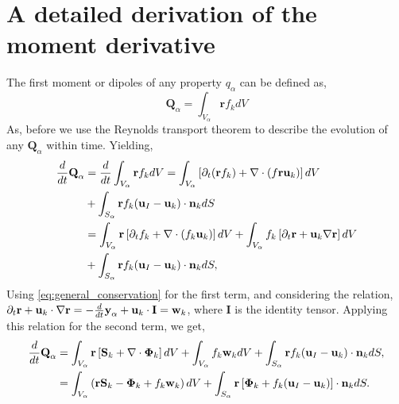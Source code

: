 \section{A detailed derivation of the moment derivative}
\label{ap:moment_derivative}
The first moment or dipoles of any property $q_\alpha$ can be defined as,
\begin{equation*}
    \textbf{Q}_\alpha 
    = \int_{V_\alpha} \textbf{r} f_k dV
\end{equation*}
As, before we use the Reynolds transport theorem to describe the evolution of any $\textbf{Q}_\alpha$ within time. 
Yielding,
\begin{align}
    \frac{d}{d t} \textbf{Q}_\alpha
    & = \frac{d}{d t} \int_{V_\alpha} \textbf{r} f_k dV  
    =  \int_{V_\alpha} \left[
        \partial_t(\textbf{r}  f_k)
        + \mathbf{\nabla} \cdot \left(f \textbf{r} \textbf{u}_k\right)
    \right]dV \nonumber \\
    &+ \int_{S_\alpha} \textbf{r}  f_k  (\textbf{u}_I-\textbf{u}_k)\cdot \textbf{n}_k  dS  \nonumber \\
    &=  \int_{V_\alpha} \textbf{r}\left[
        \partial_t f_k
        + \mathbf{\nabla} \cdot \left(f_k \textbf{u}_k\right)
    \right] dV
    + \int_{V_\alpha} f_k \left[
        \partial_t \textbf{r}
        +\textbf{u}_k \mathbf{\nabla} \textbf{r}
    \right]dV\\
    &+ \int_{S_\alpha} \textbf{r}  f_k (\textbf{u}_I-\textbf{u}_k)\cdot \textbf{n}_k  dS,
\end{align}
Using \ref{eq:general_conservation} for the first term, and considering the relation,
$  \partial_t \textbf{r}
+ \textbf{u}_k \cdot \mathbf{\nabla} \textbf{r}
= - \frac{d}{dt} \textbf{y}_\alpha  + \textbf{u}_k \cdot \textbf{I}
= \textbf{w}_k$,
where $\textbf{I}$ is the identity tensor. 
Applying this relation for the second term, we get, 
\begin{align}
    \frac{d}{d t} \textbf{Q}_\alpha
    &= \int_{V_\alpha} \textbf{r} \left[
         \textbf{S}_k +  \mathbf{\nabla} \cdot \mathbf{\Phi}_k
    \right]dV
    +\int_{V_\alpha} f_k  \textbf{w}_k dV
    + \int_{S_\alpha} \textbf{r}  f_k (\textbf{u}_I-\textbf{u}_k)\cdot \textbf{n}_k  dS,\\
    &= \int_{V_\alpha} \left( 
        \textbf{r} \textbf{S}_k 
        - \mathbf{\Phi}_k
        + f_k  \textbf{w}_k 
    \right) dV
    + \int_{S_\alpha} \textbf{r} \left[
        \mathbf{\Phi}_k
        + f_k (\textbf{u}_I-\textbf{u}_k)
    \right]\cdot \textbf{n}_k  dS.
\end{align}